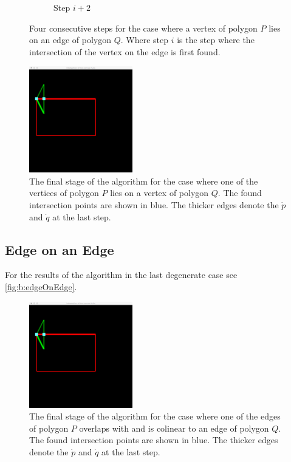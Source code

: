 \begin{figure}
\begin{subfigure}{0.24\textwidth}
				\caption{Step $i + 2$}
				\label{subfig:b:vertexOnVertex:step3}			
			\end{subfigure}				
			\caption{Four consecutive steps for the case where a vertex of polygon $P$ lies on an edge of polygon $Q$. Where step $i$ is the step where the intersection of the vertex on the edge is first found.}
			\label{fig:b:vertexOnVertexSteps}
		\end{figure}

		\begin{figure}
			\centering
			\includegraphics[width=0.4\textwidth]{./img/b_result_deg_two}
			\caption{The final stage of the algorithm for the case where one of the vertices of polygon $P$ lies on a vertex of polygon $Q$. The found intersection points are shown in blue. The thicker edges denote the $\dot{p}$ and $\dot{q}$ at the last step.}
			\label{fig:b:vertexOnVertex}
		\end{figure}

\subsection*{Edge on an Edge}
	For the results of the algorithm in the last degenerate case see \autoref{fig:b:edgeOnEdge}.

		\begin{figure}
			\centering
			\includegraphics[width=0.4\textwidth]{./img/b_result_deg_two}
			\caption{The final stage of the algorithm for the case where one of the edges of polygon $P$ overlaps with and is colinear to an edge of polygon $Q$. The found intersection points are shown in blue. The thicker edges denote the $\dot{p}$ and $\dot{q}$ at the last step.}
			\label{fig:b:edgeOnEdge}
		\end{figure}